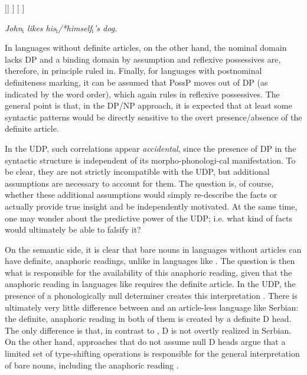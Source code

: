 \documentclass[output=paper,
modfonts
]{langscibook}
\begin{document}
	\ea \label{ex:despic:4}
	\ea 
	\begin{forest}
		[\textbf{DP}
		[\textbf{D}\\\textit{\textbf{the}}]
		[PossP
		[*Reflexive
		] 
		[Poss'[Poss
		][NP[{},roof]]]
		]
		]
		]
	\end{forest}
	
	\ex \textit{John\textnormal{$_\text{i}$} likes his\textnormal{$_\text{i}$}\textnormal{/*}himself\textnormal{$_\text{i}$}'s dog.}
	\z
	\z\largerpage
	
	In languages without definite articles, on the other hand, the nominal domain lacks DP and a binding domain by assumption and reflexive possessives are, therefore, in principle ruled in. Finally, for languages with postnominal definiteness marking, it can be assumed that PossP moves out of DP (as indicated by the word order), which again rules in reflexive possessives.  The general point is that, in the DP/NP approach, it is expected that at least some syntactic patterns would be directly sensitive to the overt presence/absence of the definite article.  
	
	In the UDP, such correlations appear \textit{accidental}, since the presence of DP in the syntactic structure is independent of its morpho-phonologi\hyp{}cal manifestation.  To be clear, they are not strictly incompatible with the UDP, but additional assumptions are necessary to account for them. The question is, of course, whether these additional assumptions would simply re-describe the facts or actually provide true insight and be independently motivated.  At the same time, one may wonder about the predictive power of the UDP; i.e. what kind of facts would ultimately be able to falsify it?\largerpage
	
	On the semantic side, it is clear that bare nouns in languages without articles can have definite, anaphoric readings, unlike in languages like . The question is then what is responsible for the availability of this anaphoric reading, given that the anaphoric reading in languages like  requires the definite article. In the UDP, the presence of a phonologically null determiner creates this interpretation \citep[e.g.][]{Longobardi1994}. There is ultimately very little difference between  and an article-less language like Serbian: the definite, anaphoric reading in both of them is created by a definite D head. The only difference is that, in contrast to , D is not overtly realized in Serbian. On the other hand, approaches that do not assume null D heads argue that a limited set of type-shifting operations is responsible for the  general interpretation of bare nouns, including the anaphoric reading \citep[e.g.][]{Chierchia1998,Dayal2004}.  
	
\end{document}

